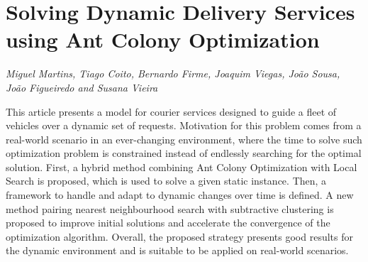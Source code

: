 \documentclass[../booklet.tex]{subfiles}
\begin{document}
\section[Solving Dynamic Delivery Services using Ant Colony Optimization. {\it Miguel Martins, Tiago Coito, Bernardo Firme, Joaquim Viegas, João Sousa, João Figueiredo and Susana Vieira}]{Solving Dynamic Delivery Services using Ant Colony Optimization}
      

\begin{center}
  {\it Miguel Martins, Tiago Coito, Bernardo Firme, Joaquim Viegas, João Sousa, João Figueiredo and Susana Vieira}
\end{center}

\vskip 0.8cm


This article presents a model for courier services designed to guide a fleet of vehicles over a dynamic set of requests.
Motivation for this problem comes from a real-world scenario in an ever-changing environment, where the time to solve such optimization problem is constrained instead of  endlessly searching for the optimal solution. 
First, a hybrid method combining Ant Colony Optimization with Local Search is proposed, which is used to solve a given static instance.
Then, a framework to handle and adapt to dynamic changes over time is defined. 
A new method pairing nearest neighbourhood search with subtractive clustering is proposed to improve initial solutions and accelerate the convergence of the optimization algorithm.
Overall, the proposed strategy presents good results for the dynamic environment and is suitable to be applied on real-world scenarios.

\end{document}
